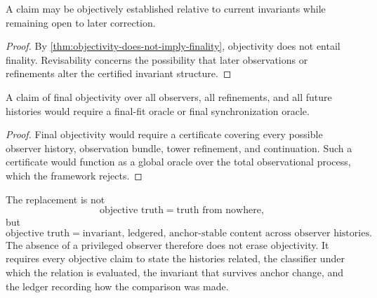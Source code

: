 \begin{corollary}
\label{cor:objectivity-compatible-revisability}
A claim may be objectively established relative to current invariants while remaining open to later correction.
\end{corollary}

\begin{proof}
By \autoref{thm:objectivity-does-not-imply-finality}, objectivity does not entail finality. Revisability concerns the possibility that later observations or refinements alter the certified invariant structure.
\end{proof}

\begin{corollary}
\label{cor:final-objectivity-requires-oracle}
A claim of final objectivity over all observers, all refinements, and all future histories would require a final-fit oracle or final synchronization oracle.
\end{corollary}

\begin{proof}
Final objectivity would require a certificate covering every possible observer history, observation bundle, tower refinement, and continuation. Such a certificate would function as a global oracle over the total observational process, which the framework rejects.
\end{proof}

\begin{remark}
\label{rem:objectivity-compressed-form}
The replacement is not
$$
\text{objective truth}
=
\text{truth from nowhere},
$$
but
$$
\text{objective truth}
=
\text{invariant, ledgered, anchor-stable content across observer histories}.
$$
The absence of a privileged observer therefore does not erase objectivity. It requires every objective claim to state the histories related, the classifier under which the relation is evaluated, the invariant that survives anchor change, and the ledger recording how the comparison was made.
\end{remark}


